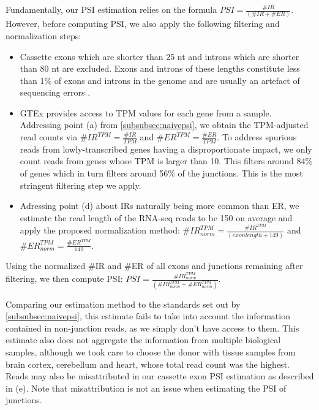 Fundamentally, our PSI estimation relies on the formula $PSI = \frac{\#IR}{(\#IR+\#ER)}$. However, before computing PSI, we also apply the following filtering and normalization steps:
\begin{itemize}
	\item Cassette exons which are shorter than 25 nt and introns which are shorter than 80 nt are excluded. Exons and introns of these lengths constitute less than 1\% of exons and introns in the genome and are usually an artefact of sequencing errors \cite{dsc} \cite{shortintrons}.
	\item GTEx provides access to TPM values for each gene from a sample. Addressing point (a) from \ref{subsubsec:naivepsi}, we obtain the TPM-adjusted read counts via $\#IR^{TPM} = \frac{\#IR}{TPM}$ and $\#ER^{TPM} = \frac{\#ER}{TPM}$. To address spurious reads from lowly-transcribed genes having a disproportionate impact, we only count reads from genes whose TPM is larger than 10. This filters around 84\% of genes which in turn filters around 56\% of the junctions. This is the most stringent filtering step we apply. 
	
	\item Adressing point (d) about IRs naturally being more common than ER, we estimate the read length of the RNA-seq reads to be 150 on average \cite{gtex_read_length} and apply the proposed normalization method: $\#IR^{TPM}_{norm} = \frac{\#IR^{TPM}}{(exon length + 149)}$ and $\#ER^{TPM}_{norm} = \frac{\#ER^{TPM}}{149}$.
\end{itemize}

Using the normalized \#IR and \#ER of all exons and junctions remaining after filtering, we then compute PSI: $PSI = \frac{\#IR^{TPM}_{norm}}{(\#IR^{TPM}_{norm}+\#ER^{TPM}_{norm})}$. 

Comparing our estimation method to the standards set out by \ref{subsubsec:naivepsi}, this estimate fails to take into account the information contained in non-junction reads, as we simply don't have access to them.
This estimate also does not aggregate the information from multiple biological samples, although we took care to choose the donor with tissue samples from brain cortex, cerebellum and heart, whose total read count was the highest. 
Reads may also be misattributed in our cassette exon PSI estimation as described in (e). Note that misattribution is not an issue when estimating the PSI of junctions.

